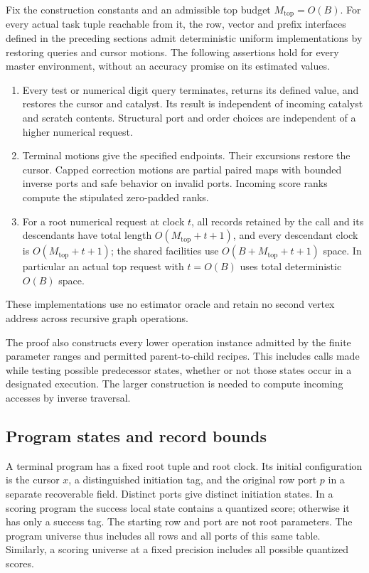 \begin{theorem}\label{thm:ctrl-realization}
Fix the construction constants and an admissible top budget
$M_{\mathrm{top}}=O(B)$.  For every actual task tuple reachable from it,
the row, vector and prefix interfaces defined in the preceding sections
admit deterministic uniform implementations by restoring queries and
cursor motions.
The following assertions hold for every master environment, without an
accuracy promise on its estimated values.
\begin{enumerate}
\item Every test or numerical digit query terminates, returns its
  defined value, and restores the cursor and catalyst.  Its result is
  independent of incoming catalyst and scratch contents.  Structural
  port and order choices are independent of a higher numerical request.
\item Terminal motions give the specified endpoints.  Their excursions
  restore the cursor.  Capped correction motions are partial paired
  maps with bounded inverse ports and safe behavior on invalid ports.
  Incoming score ranks compute the stipulated zero-padded ranks.
\item For a root numerical request at clock $t$, all records retained by the
  call and its descendants have total length $O(M_{\mathrm{top}}+t+1)$,
  and every descendant clock is $O(M_{\mathrm{top}}+t+1)$; the shared
  facilities use $O(B+M_{\mathrm{top}}+t+1)$ space.  In particular an
  actual top request with $t=O(B)$ uses total deterministic $O(B)$ space.
\end{enumerate}
These implementations use no estimator oracle and retain no second
vertex address across recursive graph operations.
\end{theorem}

The proof also constructs every lower operation instance admitted by the
finite parameter ranges and permitted parent-to-child recipes.  This
includes calls made while testing possible predecessor states, whether
or not those states occur in a designated execution.  The larger
construction is needed to compute incoming accesses by inverse traversal.

\subsection{Program states and record bounds}\label{sec:ctrl-graphs}

A terminal program has a fixed root tuple and root clock.  Its initial
configuration is the cursor $x$, a distinguished initiation tag, and the
original row port $p$ in a separate recoverable field.  Distinct ports
give distinct initiation states.  In a scoring program the success local state contains a
quantized score; otherwise it has only a success tag.  The starting row
and port are not root parameters.  The program universe thus includes
all rows and all ports of this same table.  Similarly, a scoring
universe at a fixed precision includes all possible quantized scores.

